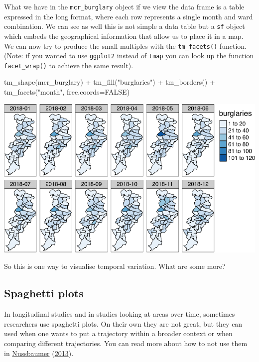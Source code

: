 \documentclass[
]{book}
\newenvironment{Shaded}{\begin{snugshade}}{\end{snugshade}}
\newcommand{\AttributeTok}[1]{\textcolor[rgb]{0.77,0.63,0.00}{#1}}
\newcommand{\ConstantTok}[1]{\textcolor[rgb]{0.00,0.00,0.00}{#1}}
\newcommand{\FunctionTok}[1]{\textcolor[rgb]{0.00,0.00,0.00}{#1}}
\newcommand{\NormalTok}[1]{#1}
\newcommand{\SpecialCharTok}[1]{\textcolor[rgb]{0.00,0.00,0.00}{#1}}
\newcommand{\StringTok}[1]{\textcolor[rgb]{0.31,0.60,0.02}{#1}}
\begin{document}
What we have in the \texttt{mcr\_burglary} object if we view the data frame is a table expressed in the long format, where each row represents a single month and ward combination. We can see as well this is not simple a data table but a \texttt{sf} object which embeds the geographical information that allow us to place it in a map. We can now try to produce the small multiples with the \texttt{tm\_facets()} function. (Note: if you wanted to use \texttt{ggplot2} instead of \texttt{tmap} you can look up the function \texttt{facet\_wrap()} to achieve the same result).

\begin{Shaded}
\begin{Highlighting}[]
\FunctionTok{tm\_shape}\NormalTok{(mcr\_burglary) }\SpecialCharTok{+} 
  \FunctionTok{tm\_fill}\NormalTok{(}\StringTok{"burglaries"}\NormalTok{) }\SpecialCharTok{+}
  \FunctionTok{tm\_borders}\NormalTok{() }\SpecialCharTok{+}
  \FunctionTok{tm\_facets}\NormalTok{(}\StringTok{"month"}\NormalTok{, }\AttributeTok{free.coords=}\ConstantTok{FALSE}\NormalTok{)}
\end{Highlighting}
\end{Shaded}

\includegraphics{crime_mapping_files/figure-latex/unnamed-chunk-180-1.pdf}

So this is one way to visualise temporal variation. What are some more?

\hypertarget{spaghetti-plots}{%
\subsection{Spaghetti plots}\label{spaghetti-plots}}

In longitudinal studies and in studies looking at areas over time, sometimes researchers use spaghetti plots. On their own they are not great, but they can used when one wants to put a trajectory within a broader context or when comparing different trajectories. You can read more about how to not use them in \protect\hyperlink{ref-Nussbaumer_2013}{Nussbaumer} (\protect\hyperlink{ref-Nussbaumer_2013}{2013}).
\end{document}
